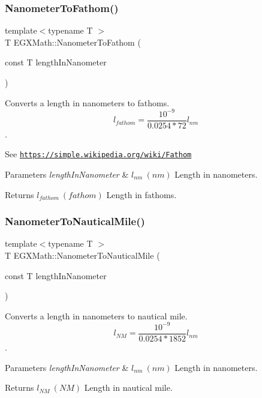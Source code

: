 \subsubsection{\texorpdfstring{Nanometer\+To\+Fathom()}{NanometerToFathom()}}
{\footnotesize\ttfamily template$<$typename T $>$ \\
T E\+G\+X\+Math\+::\+Nanometer\+To\+Fathom (\begin{DoxyParamCaption}\item[{const T}]{length\+In\+Nanometer }\end{DoxyParamCaption})}



Converts a length in nanometers to fathoms. \[ l_{fathom}= \frac{10^{-9}}{0.0254 * 72} l_{nm} \]. 

See \href{https://simple.wikipedia.org/wiki/Fathom}{\tt https\+://simple.\+wikipedia.\+org/wiki/\+Fathom} 
\begin{DoxyParams}{Parameters}
{\em length\+In\+Nanometer} & $ l_{nm}\ (nm)$ Length in nanometers. \\
\hline
\end{DoxyParams}
\begin{DoxyReturn}{Returns}
$ l_{fathom}\ (fathom)$ Length in fathoms. 
\end{DoxyReturn}
\mbox{\label{group___e_g_x_math-_conversions-_length_conversions-_nanometer-_nautical_gac428c495bff87ba53c856395a7410fc3}} 
\subsubsection{\texorpdfstring{Nanometer\+To\+Nautical\+Mile()}{NanometerToNauticalMile()}}
{\footnotesize\ttfamily template$<$typename T $>$ \\
T E\+G\+X\+Math\+::\+Nanometer\+To\+Nautical\+Mile (\begin{DoxyParamCaption}\item[{const T}]{length\+In\+Nanometer }\end{DoxyParamCaption})}



Converts a length in nanometers to nautical mile. \[ l_{NM}= \frac{10^{-9}}{0.0254 * 1852} l_{nm} \]. 


\begin{DoxyParams}{Parameters}
{\em length\+In\+Nanometer} & $ l_{nm}\ (nm)$ Length in nanometers. \\
\hline
\end{DoxyParams}
\begin{DoxyReturn}{Returns}
$ l_{NM}\ (NM)$ Length in nautical mile. 
\end{DoxyReturn}
